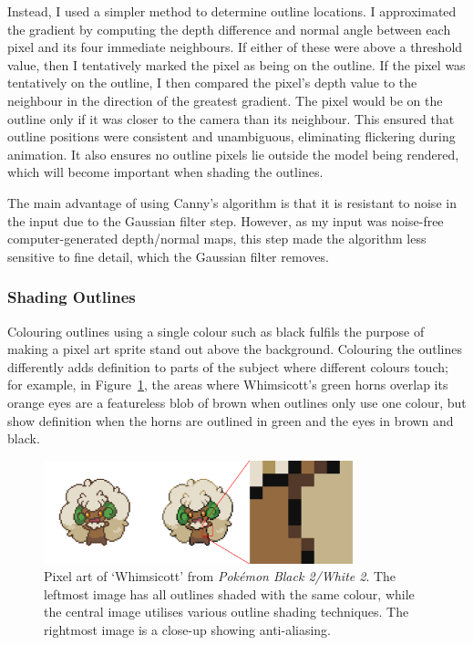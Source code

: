 \documentclass[12pt,twoside,notitlepage]{report}
\begin{document}
Instead, I used a simpler method to determine outline locations. I approximated the gradient by computing the depth difference and normal angle between each pixel and its four immediate neighbours. If either of these were above a threshold value, then I tentatively marked the pixel as being on the outline. If the pixel was tentatively on the outline, I then compared the pixel's depth value to the neighbour in the direction of the greatest gradient. The pixel would be on the outline only if it was closer to the camera than its neighbour. This ensured that outline positions were consistent and unambiguous, eliminating flickering during animation. It also ensures no outline pixels lie outside the model being rendered, which will become important when shading the outlines.

The main advantage of using Canny's algorithm is that it is resistant to noise in the input due to the Gaussian filter step. However, as my input was noise-free computer-generated depth/normal maps, this step made the algorithm less sensitive to fine detail, which the Gaussian filter removes.

\subsubsection{Shading Outlines}

Colouring outlines using a single colour such as black fulfils the purpose of making a pixel art sprite stand out above the background. Colouring the outlines differently adds definition to parts of the subject where different colours touch; for example, in Figure~\ref{fig:antialiasedoutline}, the areas where Whimsicott's green horns overlap its orange eyes are a featureless blob of brown when outlines only use one colour, but show definition when the horns are outlined in green and the eyes in brown and black.

\begin{figure}[h!]
\centering
\includegraphics[width=0.8\textwidth]{antialiasedoutline}
\caption{Pixel art of `Whimsicott' from \textit{Pok\'{e}mon Black 2/White 2}. The leftmost image has all outlines shaded with the same colour, while the central image utilises various outline shading techniques. The rightmost image is a close-up showing anti-aliasing.}
\label{fig:antialiasedoutline}
\end{figure}
\end{document}

